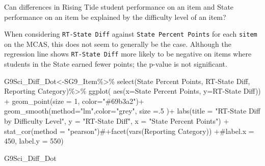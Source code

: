 \documentclass[
  letterpaper,
  DIV=11,
  numbers=noendperiod]{scrartcl}
\newenvironment{Shaded}{\begin{snugshade}}{\end{snugshade}}
\newcommand{\AttributeTok}[1]{\textcolor[rgb]{0.40,0.45,0.13}{#1}}
\newcommand{\CommentTok}[1]{\textcolor[rgb]{0.37,0.37,0.37}{#1}}
\newcommand{\DecValTok}[1]{\textcolor[rgb]{0.68,0.00,0.00}{#1}}
\newcommand{\FunctionTok}[1]{\textcolor[rgb]{0.28,0.35,0.67}{#1}}
\newcommand{\NormalTok}[1]{\textcolor[rgb]{0.00,0.23,0.31}{#1}}
\newcommand{\OtherTok}[1]{\textcolor[rgb]{0.00,0.23,0.31}{#1}}
\newcommand{\SpecialCharTok}[1]{\textcolor[rgb]{0.37,0.37,0.37}{#1}}
\newcommand{\StringTok}[1]{\textcolor[rgb]{0.13,0.47,0.30}{#1}}
\begin{document}
Can differences in Rising Tide student performance on an item and State
performance on an item be explained by the difficulty level of an item?

When considering \texttt{RT-State\ Diff} against
\texttt{State\ Percent\ Points} for each \texttt{sitem} on the MCAS,
this does not seem to generally be the case. Although the regression
line shows \texttt{RT-State\ Diff} more likely to be negative on items
where students in the State earned fewer points; the p-value is not
significant.

\begin{Shaded}
\begin{Highlighting}[]
\NormalTok{G9Sci\_Diff\_Dot}\OtherTok{\textless{}{-}}\NormalTok{SG9\_Item}\SpecialCharTok{\%\textgreater{}\%}
  \FunctionTok{select}\NormalTok{(}\StringTok{\textasciigrave{}}\AttributeTok{State Percent Points}\StringTok{\textasciigrave{}}\NormalTok{, }\StringTok{\textasciigrave{}}\AttributeTok{RT{-}State Diff}\StringTok{\textasciigrave{}}\NormalTok{, }\StringTok{\textasciigrave{}}\AttributeTok{Reporting Category}\StringTok{\textasciigrave{}}\NormalTok{)}\SpecialCharTok{\%\textgreater{}\%}
 \FunctionTok{ggplot}\NormalTok{( }\FunctionTok{aes}\NormalTok{(}\AttributeTok{x=}\StringTok{\textasciigrave{}}\AttributeTok{State Percent Points}\StringTok{\textasciigrave{}}\NormalTok{, }\AttributeTok{y=}\StringTok{\textasciigrave{}}\AttributeTok{RT{-}State Diff}\StringTok{\textasciigrave{}}\NormalTok{)) }\SpecialCharTok{+}
     \FunctionTok{geom\_point}\NormalTok{(}\AttributeTok{size =} \DecValTok{1}\NormalTok{, }\AttributeTok{color=}\StringTok{"\#69b3a2"}\NormalTok{)}\SpecialCharTok{+}
 \FunctionTok{geom\_smooth}\NormalTok{(}\AttributeTok{method=}\StringTok{"lm"}\NormalTok{,}\AttributeTok{color=}\StringTok{"grey"}\NormalTok{, }\AttributeTok{size =}\NormalTok{.}\DecValTok{5}\NormalTok{ )}\SpecialCharTok{+}
  \FunctionTok{labs}\NormalTok{(}\AttributeTok{title =} \StringTok{"RT{-}State Diff by Difficulty Level"}\NormalTok{, }\AttributeTok{y =} \StringTok{"RT{-}State Diff"}\NormalTok{,}
       \AttributeTok{x =} \StringTok{"State Percent Points"}\NormalTok{) }\SpecialCharTok{+}
  \FunctionTok{stat\_cor}\NormalTok{(}\AttributeTok{method =} \StringTok{"pearson"}\NormalTok{)}\CommentTok{\#+facet(vars(\textasciigrave{}Reporting Category\textasciigrave{})) +\#label.x = 450, label.y = 550)}

\NormalTok{G9Sci\_Diff\_Dot}
\end{Highlighting}
\end{Shaded}
\end{document}
